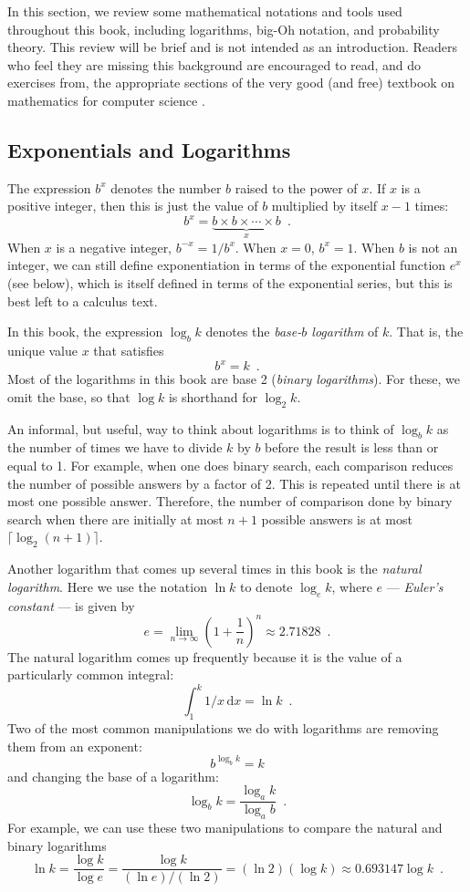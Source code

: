 In this section, we review some mathematical notations and tools
used throughout this book, including logarithms, big-Oh notation, and
probability theory.  This review will be brief and is not intended as
an introduction. Readers who feel they are missing this background are
encouraged to read, and do exercises from, the appropriate sections of
the very good (and free) textbook on mathematics for computer science
\cite{llm11}.

\subsection{Exponentials and Logarithms}

%
The expression $b^x$ denotes the number $b$ raised to the power of $x$.
If $x$ is a positive integer, then this is just the value of $b$
multiplied by itself $x-1$ times:
\[
    b^x = \underbrace{b\times b\times \cdots \times b}_{x} \enspace .
\]
When $x$ is a negative integer, $b^{-x}=1/b^{x}$.  When $x=0$, $b^x=1$.
When $b$ is not an integer, we can still define exponentiation in terms
of the exponential function $e^x$ (see below), which is itself defined in
terms of the exponential series, but this is best left to a calculus text.

%
In this book, the expression $\log_b k$ denotes the \emph{base-$b$ logarithm}
of $k$.  That is, the unique value $x$ that satisfies
\[
    b^{x} = k  \enspace .
\]
Most of the logarithms in this book are base 2 (\emph{binary logarithms}).
%
%
For these, we omit the base, so that $\log k$ is shorthand for
$\log_2 k$.

An informal, but useful, way to think about logarithms is to think
of $\log_b k$ as the number of times we have to divide $k$ by $b$
before the result is less than or equal to 1.  For example, when one
does binary search, each comparison reduces the number of possible
answers by a factor of 2.  This is repeated until there is at most one
possible answer.  Therefore, the number of comparison done by binary
search when there are initially at most $n+1$ possible answers is at
most $\lceil\log_2(n+1)\rceil$.

%
%
Another logarithm that comes up several times in this book is the
\emph{natural logarithm}.  Here we use the notation $\ln k$ to denote
$\log_e k$, where $e$ --- \emph{Euler's constant} --- is given by
%
%
\[
   e = \lim_{n\rightarrow\infty} \left(1+\frac{1}{n}\right)^n
   \approx  2.71828 \enspace .
\]
The natural logarithm comes up frequently because it is the value
of a particularly common integral:
\[
    \int_{1}^{k} 1/x\,\mathrm{d}x  = \ln k \enspace .
\]
Two of the most common manipulations we do with logarithms are removing
them from an exponent:
\[
    b^{\log_b k} = k
\]
and changing the base of a logarithm:
\[
    \log_b k = \frac{\log_a k}{\log_a b} \enspace .
\]
For example, we can use these two manipulations to compare the natural and binary logarithms
\[
   \ln k = \frac{\log k}{\log e} = \frac{\log k}{(\ln e)/(\ln 2)} = 
    (\ln 2)(\log k) \approx 0.693147\log k \enspace .
\]

